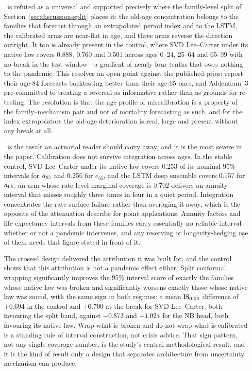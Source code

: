 \Hfour\ is refuted as a universal and supported precisely where the
family-level split of Section~\ref{sec:discussion-split} places it: the
old-age concentration belongs to the families that forecast through an
extrapolated period index and to the LSTM, the calibrated arms are
near-flat in age, and three arms reverse the direction outright. It too
is already present in the control, where SVD Lee--Carter under its native
law covers 0.888, 0.760 and 0.501 across ages 0--24, 25--64 and 65--99
with no break in the test window---a gradient of nearly four tenths that
owes nothing to the pandemic. This resolves an open point against the
published prior: \citet{dowd2010backtesting} report their age-84
forecasts backtesting better than their age-65 ones, and Addendum~3
pre-committed to treating a reversal as informative rather than as
grounds for re-testing. The resolution is that the age profile of
miscalibration is a property of the family--mechanism pair and not of
mortality forecasting as such, and for the index extrapolators the
old-age deterioration is real, large and present without any break at
all.

\Hfive\ is the result an actuarial reader should carry away, and it is
the most severe in the paper. Calibration does not survive integration
across ages. In the stable control, SVD Lee--Carter under its native law
covers 0.253 of its nominal 95\% intervals for $\ddot{a}_{65}$ and 0.256 for
$e_{65}$, and the LSTM deep ensemble covers 0.157 for $\ddot{a}_{65}$: an arm
whose rate-level marginal coverage is 0.702 delivers an annuity interval
that misses roughly three times in four in a quiet period. Integration
concentrates the rate-surface failure rather than averaging it away,
which is the opposite of the attenuation \citet{cairns2011mortality}
describe for point applications. Annuity factors and life-expectancy
intervals from these families carry essentially no reliable interval
whether or not a pandemic intervenes, and any reserving or
longevity-hedging use of them needs that figure stated in front of it.

The crossed design delivered the attribution it was built for, and the
control shows that this attribution is not a pandemic effect either.
Split conformal wrapping significantly improves the 95\% interval score
of exactly the families whose native law was broken and significantly
worsens exactly those whose native law was sound, with the same sign in
both regimes: a mean $\operatorname{IS}_{0.05}$ difference of $+0.694$ in the control
and $+0.700$ at the break for SVD Lee--Carter, both favouring the split
band, against $-0.873$ and $-1.024$ for the NB head, both favouring its
native law. Wrap what is broken and do not wrap what is calibrated is a
standing rule of interval construction, not crisis advice. That sign
pattern, not any single coverage number, is the study's central
methodological result, and it is the kind of result only a design that
separates architecture from uncertainty mechanism can produce.

